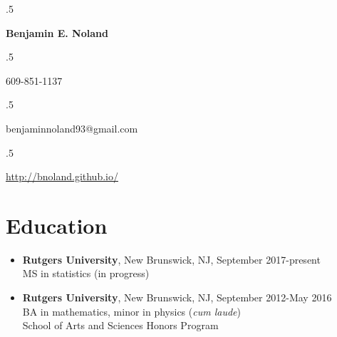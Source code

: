 \documentclass[12pt]{article}
\begin{document}
\moveleft.5\hoffset\centerline{\Large\bf Benjamin E. Noland}
\smallskip
\moveleft.5\hoffset\centerline{609-851-1137}
\moveleft.5\hoffset\centerline{benjaminnoland93@gmail.com}
\moveleft.5\hoffset\centerline{\url{http://bnoland.github.io/}}

\section*{Education}

\begin{itemize}
\item
\textbf{Rutgers University}, New Brunswick, NJ, September 2017-present \\
MS in statistics (in progress)

\item
\textbf{Rutgers University}, New Brunswick, NJ, September 2012-May 2016 \\
BA in mathematics, minor in physics (\textit{cum laude}) \\
School of Arts and Sciences Honors Program
\end{itemize}
\iffalse
\subsection*{Selection of coursework:}
\begin{itemize}
\item
\textbf{Mathematics:} Calculus, linear algebra, ordinary differential equations, real analysis, complex variables, differential geometry, linear programming, abstract algebra, topology \textit{(taken at Rutgers University)}

\item
\textbf{Physics:}
Classical mechanics, electromagnetism, astrophysics \textit{(taken at Rutgers University)}

\item
\textbf{Computer science:}
Systems programming, data structures and algorithms \textit{(taken at Princeton University while in high school)}; Advanced Placement computer science \textit{(taken in high school)}

\item
\textbf{Statistics:} Advanced Placement statistics \textit{(taken in high school)}, probability theory, regression analysis \textit{(taking at Rutgers University)}

\end{itemize}
\fi
\end{document}
